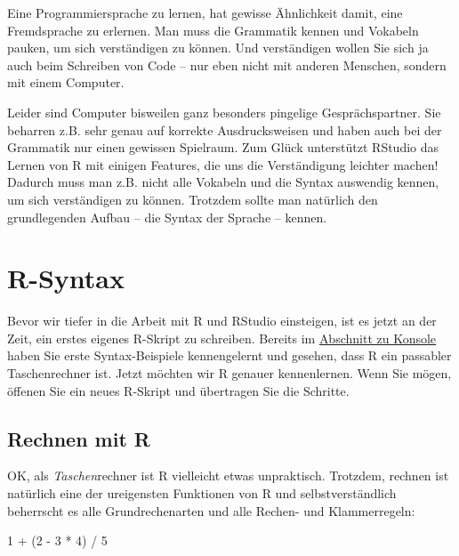 \documentclass[
]{book}
\newenvironment{Shaded}{\begin{snugshade}}{\end{snugshade}}
\newcommand{\DecValTok}[1]{\textcolor[rgb]{0.00,0.00,0.81}{#1}}
\newcommand{\NormalTok}[1]{#1}
\newcommand{\SpecialCharTok}[1]{\textcolor[rgb]{0.00,0.00,0.00}{#1}}
\begin{document}
Eine Programmiersprache zu lernen, hat gewisse Ähnlichkeit damit, eine Fremdsprache zu erlernen. Man muss die Grammatik kennen und Vokabeln pauken, um sich verständigen zu können. Und verständigen wollen Sie sich ja auch beim Schreiben von Code -- nur eben nicht mit anderen Menschen, sondern mit einem Computer.

Leider sind Computer bisweilen ganz besonders pingelige Gesprächspartner. Sie beharren z.B. sehr genau auf korrekte Ausdrucksweisen und haben auch bei der Grammatik nur einen gewissen Spielraum. Zum Glück unterstützt RStudio das Lernen von R mit einigen Features, die uns die Verständigung leichter machen! Dadurch muss man z.B. nicht alle Vokabeln und die Syntax auswendig kennen, um sich verständigen zu können. Trotzdem sollte man natürlich den grundlegenden Aufbau -- die Syntax der Sprache -- kennen.

\hypertarget{r-syntax}{%
\section{R-Syntax}\label{r-syntax}}

Bevor wir tiefer in die Arbeit mit R und RStudio einsteigen, ist es jetzt an der Zeit, ein erstes eigenes R-Skript zu schreiben. Bereits im \protect\hyperlink{konsole}{Abschnitt zu Konsole} haben Sie erste Syntax-Beispiele kennengelernt und gesehen, dass R ein passabler Taschenrechner ist. Jetzt möchten wir R genauer kennenlernen. Wenn Sie mögen, öffenen Sie ein neues R-Skript und übertragen Sie die Schritte.

\hypertarget{rechnen-mit-r}{%
\subsection{Rechnen mit R}\label{rechnen-mit-r}}

OK, als \emph{Taschen}rechner ist R vielleicht etwas unpraktisch. Trotzdem, rechnen ist natürlich eine der ureigensten Funktionen von R und selbstverständlich beherrscht es alle Grundrechenarten und alle Rechen- und Klammerregeln:

\begin{Shaded}
\begin{Highlighting}[]
\DecValTok{1} \SpecialCharTok{+}\NormalTok{ (}\DecValTok{2} \SpecialCharTok{{-}} \DecValTok{3} \SpecialCharTok{*} \DecValTok{4}\NormalTok{) }\SpecialCharTok{/} \DecValTok{5} 
\end{Highlighting}
\end{Shaded}
\end{document}
